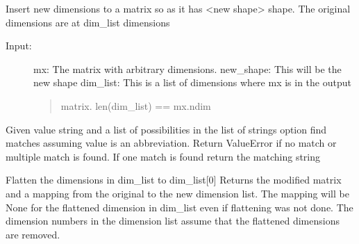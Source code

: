 \documentclass[letterpaper,10pt,english]{sphinxmanual}
\begin{document}
\begin{fulllineitems}
\label{\detokenize{tools:flap.tools.expand_matrix}}
Insert new dimensions to a matrix so as it has \textless{}new shape\textgreater{} shape.
The original dimensions are at dim\_list dimensions
\begin{description}
\item[{Input:}] \leavevmode
mx: The matrix with arbitrary dimensions.
new\_shape: This will be the new shape
dim\_list: This is a list of dimensions where mx is in the output
\begin{quote}

matrix. len(dim\_list) == mx.ndim
\end{quote}

\end{description}

\end{fulllineitems}


\begin{fulllineitems}
\label{\detokenize{tools:flap.tools.find_str_match}}
Given value string and a list of possibilities in the list of strings option
find matches assuming value is an abbreviation. Return ValueError if no match
or multiple match is found.
If one match is found return the matching string

\end{fulllineitems}


\begin{fulllineitems}
\label{\detokenize{tools:flap.tools.flatten_multidim}}
Flatten the dimensions in dim\_list to dim\_list{[}0{]}
Returns the modified matrix and a mapping from the original to the new dimension list.
The mapping will be None for the flattened dimension in dim\_list even if
flattening was not done. The dimension numbers in the dimension list assume that
the flattened dimensions are removed.

\end{fulllineitems}
\end{document}
